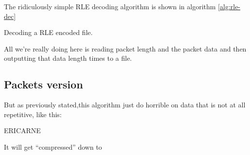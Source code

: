 \begin{refsection}
\begin{algorithm}[h]
\begin{algorithmic}[1]

    \While{\neof}

        \Else
          \State {}
          \State {}
        \EndIf
      \EndIf


    \EndWhile

     
      \State {}
      \State {}
    \EndIf
  \end{algorithmic}
\end{algorithm}

The ridiculously simple RLE decoding algorithm is shown in algorithm
\ref{alg:rle-dec}

\begin{algorithm}[h]
  \caption{Decoding a RLE encoded file.}
  \label{alg:rle-dec}
  \begin{algorithmic}[1]

    \While{\neof}

      \If{\eof}
        \Break
      \EndIf

        \State {}
      \EndRepeat
    \EndWhile
  \end{algorithmic}
\end{algorithm}

All we're really doing here is reading packet length and the packet
data and then outputting that data length times to a file.

\subsection{Packets version}
\label{sec:packets-version}

But as previously stated,this algorithm just do horrible on data that
is not at all repetitive, like this:

\begin{indentpar}
  ERICARNE
\end{indentpar}

It will get ``compressed'' down to


\end{refsection}

